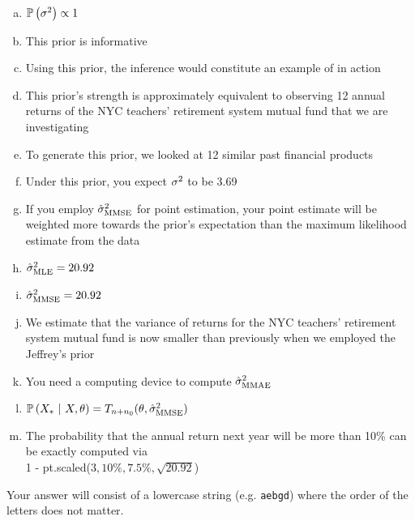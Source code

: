 \documentclass[12pt,landscape]{article}
\newcommand{\instr}{\small Your answer will consist of a lowercase string (e.g. \texttt{aebgd}) where the order of the letters does not matter. \normalsize}
\begin{document}
\begin{enumerate}[(a)]
\item $\mathbb{P}\left(\sigma^2\right) \propto 1$
\item This prior is informative 
\item Using this prior, the inference would constitute an example of  in action
\item This prior's strength is approximately equivalent to observing 12 annual returns of the NYC teachers' retirement system mutual fund that we are investigating
\item To generate this prior, we looked at 12 similar past financial products
\item Under this prior, you expect $\sigma^2$ to be 3.69
\item If you employ $\hat{\sigma}^2_{\text{MMSE}}$ for point estimation, your point estimate will be weighted more towards the prior's expectation than the maximum likelihood estimate from the data
\item $\hat{\sigma}^2_{\text{MLE}} = 20.92$
\item $\hat{\sigma}^2_{\text{MMSE}} = 20.92$
\item We estimate that the variance of returns for the NYC teachers' retirement system mutual fund is now smaller than previously when we employed the Jeffrey's prior
\item You need a computing device to compute $\hat{\sigma}^2_{\text{MMAE}}$
\item $\mathbb{P}\left(X_*~|~X, \theta\right) = T_{n+n_0}(\theta, \hat{\sigma}^2_{\text{MMSE}})$
\item The probability that the annual return next year will be more than 10\% can be exactly computed via \\ 1 - pt.scaled($3, 10\%, 7.5\%, \sqrt{20.92}$)
\end{enumerate}
\eenum\instr\pagebreak

\end{document}
